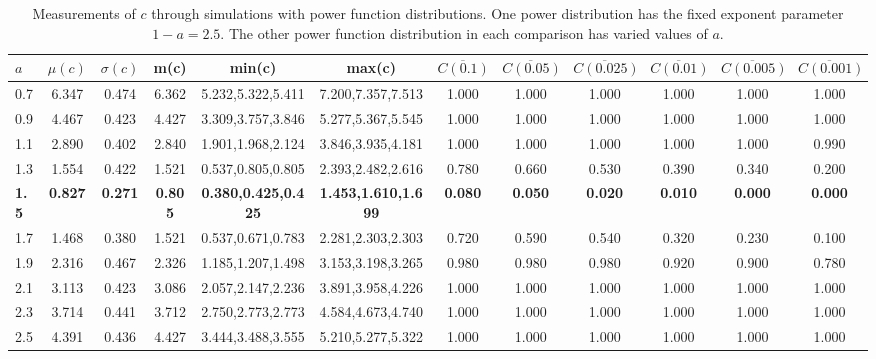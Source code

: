 \begin{table*}[h!]
\begin{center}
\begin{tabular}{| l | c | c | c | c | c | c | c | c | c | c | c |}\hline
$a$ & $\mu(c)$ & $\sigma(c)$ & m(c) & min(c) & max(c) & $\overline{C(0.1)}$ & $\overline{C(0.05)}$ & $\overline{C(0.025)}$ & $\overline{C(0.01)}$ & $\overline{C(0.005)}$ & $\overline{C(0.001)}$ \\\hline\hline
0.7 & 6.347 & 0.474 & 6.362 & 5.232,5.322,5.411 & 7.200,7.357,7.513  & 1.000  & 1.000  & 1.000  & 1.000  & 1.000  & 1.000 \\\hline
0.9 & 4.467 & 0.423 & 4.427 & 3.309,3.757,3.846 & 5.277,5.367,5.545  & 1.000  & 1.000  & 1.000  & 1.000  & 1.000  & 1.000 \\\hline
1.1 & 2.890 & 0.402 & 2.840 & 1.901,1.968,2.124 & 3.846,3.935,4.181  & 1.000  & 1.000  & 1.000  & 1.000  & 1.000  & 0.990 \\\hline
1.3 & 1.554 & 0.422 & 1.521 & 0.537,0.805,0.805 & 2.393,2.482,2.616  & 0.780  & 0.660  & 0.530  & 0.390  & 0.340  & 0.200 \\\hline
{\bf 1.5} & {\bf 0.827} & {\bf 0.271} & {\bf 0.805} & {\bf 0.380,0.425,0.425} & {\bf 1.453,1.610,1.699} & {\bf 0.080} & {\bf 0.050} & {\bf 0.020} & {\bf 0.010} & {\bf 0.000} & {\bf 0.000} \\\hline
1.7 & 1.468 & 0.380 & 1.521 & 0.537,0.671,0.783 & 2.281,2.303,2.303  & 0.720  & 0.590  & 0.540  & 0.320  & 0.230  & 0.100 \\\hline
1.9 & 2.316 & 0.467 & 2.326 & 1.185,1.207,1.498 & 3.153,3.198,3.265  & 0.980  & 0.980  & 0.980  & 0.920  & 0.900  & 0.780 \\\hline
2.1 & 3.113 & 0.423 & 3.086 & 2.057,2.147,2.236 & 3.891,3.958,4.226  & 1.000  & 1.000  & 1.000  & 1.000  & 1.000  & 1.000 \\\hline
2.3 & 3.714 & 0.441 & 3.712 & 2.750,2.773,2.773 & 4.584,4.673,4.740  & 1.000  & 1.000  & 1.000  & 1.000  & 1.000  & 1.000 \\\hline
2.5 & 4.391 & 0.436 & 4.427 & 3.444,3.488,3.555 & 5.210,5.277,5.322  & 1.000  & 1.000  & 1.000  & 1.000  & 1.000  & 1.000 \\\hline
\end{tabular}
\caption{Measurements of $c$ through simulations
        with power function distributions.
        One power distribution has the fixed exponent parameter $1-a=2.5$.
        The other power function distribution in each comparison
        has varied values of $a$.}
\end{center}
\end{table*}
